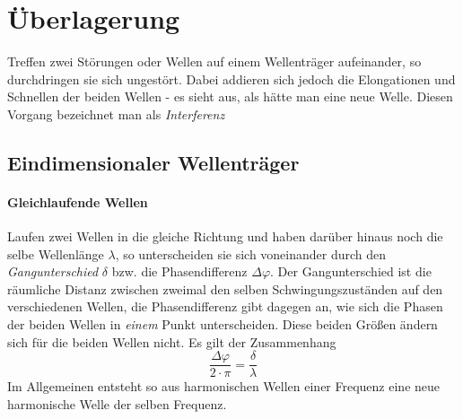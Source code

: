 		\chapter{Überlagerung}
		
Treffen zwei Störungen oder Wellen auf einem Wellenträger aufeinander, so durchdringen sie sich ungestört. Dabei addieren sich jedoch die Elongationen und Schnellen der beiden Wellen - es sieht aus, als hätte man eine neue Welle. Diesen Vorgang bezeichnet man als \emph{Interferenz}


		\section{Eindimensionaler Wellenträger}

\subsubsection{Gleichlaufende Wellen}
\label{par_Gleichlaufende Wellen}

Laufen zwei Wellen in die gleiche Richtung und haben darüber hinaus noch die selbe Wellenlänge \(\lambda\), so unterscheiden sie sich voneinander durch den \emph{Gangunterschied} \(\delta\) bzw. die Phasendifferenz \(\Delta \varphi\). Der Gangunterschied ist die räumliche Distanz zwischen zweimal den selben Schwingungszuständen auf den verschiedenen Wellen, die Phasendifferenz gibt dagegen an, wie sich die Phasen der beiden Wellen in \emph{einem} Punkt unterscheiden. Diese beiden Größen ändern sich für die beiden Wellen nicht. Es gilt der Zusammenhang
\begin{equation}
 	\frac{\Delta \varphi}{2 \cdot \pi} = \frac{\delta}{\lambda}
 	\label{eq_zshg_phasendif_ganguntersch}
\end{equation}
Im Allgemeinen entsteht so aus harmonischen Wellen einer Frequenz eine neue harmonische Welle der selben Frequenz.

